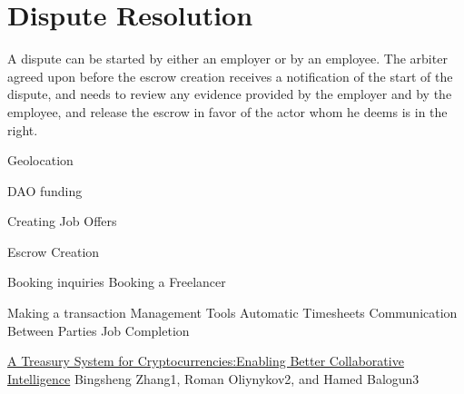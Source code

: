 \documentclass{article}
\begin{document}
\section{Dispute Resolution}
A dispute can be started by either an employer or by an employee. The arbiter agreed upon before the escrow creation receives a notification of the start of the dispute, and needs to review any evidence provided by the employer and by the employee, and release the escrow in favor of the actor whom he deems is in the right.

Geolocation

DAO funding


Creating Job Offers



Escrow Creation

Booking inquiries
Booking a Freelancer

Making a transaction
Management Tools
Automatic Timesheets
Communication Between Parties
Job Completion


\begin{thebibliography}{99}

\href{https://www.lancaster.ac.uk/staff/zhangb2/treasury.pdf}{A Treasury System for Cryptocurrencies:Enabling Better Collaborative Intelligence}
Bingsheng Zhang1, Roman Oliynykov2, and Hamed Balogun3

\end{thebibliography}
\end{document}
